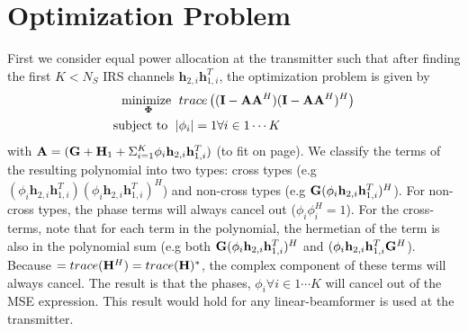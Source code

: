 \documentclass[12pt,a4paper]{report}
\begin{document}
\section{Optimization Problem}
First we consider equal power allocation at the transmitter such that after finding the first $K < N_S$ IRS channels $\mathbf{h}_{2,i}\mathbf{h}^T_{1,i}$, the optimization problem
is given by
	\begin{align}
	    \underset{\boldsymbol{\Phi}}{\text{minimize }}
	    & \; trace\left((\mathbf{I} - \mathbf{A}\mathbf{A}^H)
	   (\mathbf{I} - \mathbf{A}\mathbf{A}^H)^H \right)
	     \\
	    \text{subject to  } \; &
	    | \phi_i | = 1  \forall i \in {1 \cdots	 K}
	\end{align}
	with $\mathbf{A} = (\mathbf{G} +  \mathbf{H}_1 + \Sigma_{i=1}^{K} \phi_i \mathbf{h}_{2,i}\mathbf{h}^T_{1,i})$ (to fit on page).
	We classify the terms of the resulting polynomial into two types:
	cross types (e.g $(\phi_i \mathbf{h}_{2,i}\mathbf{h}^T_{1,i})(\phi_i \mathbf{h}_{2,i}\mathbf{h}^T_{1,i})^H$) and non-cross types (e.g $\mathbf{G} (\phi_i \mathbf{h}_{2,i}\mathbf{h}^T_{1,i})^H$). For non-cross types, the phase terms will always cancel out ($\phi_i \phi_i^H = 1$). For the cross-terms, note that
	for each term in the polynomial, the hermetian of the term is also in the polynomial sum (e.g both $\mathbf{G} (\phi_i \mathbf{h}_{2,i}\mathbf{h}^T_{1,i})^H$ and $ (\phi_i \mathbf{h}_{2,i}\mathbf{h}^T_{1,i}\mathbf{G}^H$). Because $= trace(\mathbf{H}^H) = trace(\mathbf{H})^*$, the complex component of these terms will always cancel. The result is that the phases, $\phi_i \forall i \in {1 \cdots	 K}$ will cancel out of the MSE expression. This result would hold for any linear-beamformer is used at the transmitter.

\end{document}
